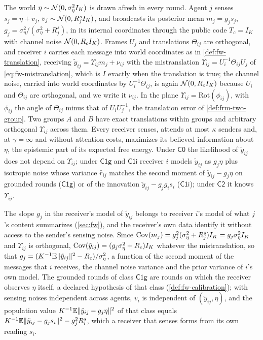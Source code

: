 \begin{definition}\label{def:coh-calibration-model}
The world $\eta\sim\mathcal{N}(0,\sigma_\eta^2I_K)$ is drawn afresh in every round. Agent $j$ senses $s_j=\eta+v_j$, $v_j\sim\mathcal{N}(0,R^s_jI_K)$, and broadcasts its posterior mean $m_j=g_js_j$, $g_j=\sigma_\eta^2/(\sigma_\eta^2+R^s_j)$, in its internal coordinates through the public code $T_c=I_K$ with channel noise $\mathcal{N}(0,R_cI_K)$. Frames $U_j$ and translations $\Theta_{ij}$ are orthogonal, and receiver $i$ carries each message into world coordinates as in \cref{def:fw-translation}, receiving $\tilde y_{ij}=\Upsilon_{ij}m_j+\nu_{ij}$ with the mistranslation $\Upsilon_{ij}=U_i^{-1}\Theta_{ij}U_j$ of \eqref{eq:fw-mistranslation}, which is $I$ exactly when the translation is true; the channel noise, carried into world coordinates by $U_i^{-1}\Theta_{ij}$, is again $\mathcal{N}(0,R_cI_K)$ because $U_i$ and $\Theta_{ij}$ are orthogonal, and we write it $\nu_{ij}$. In the plane $\Upsilon_{ij}=\mathrm{Rot}(\phi_{ij})$, with $\phi_{ij}$ the angle of $\Theta_{ij}$ minus that of $U_iU_j^{-1}$, the translation error of \cref{def:frm-two-group}. Two groups $A$ and $B$ have exact translations within groups and arbitrary orthogonal $\Upsilon_{ij}$ across them. Every receiver senses, attends at most $\kappa$ senders and, at $\gamma=\infty$ and without attention costs, maximizes its believed information about $\eta$, the epistemic part of its expected free energy. Under $\mathsf{C0}$ the likelihood of $\tilde y_{ij}$ does not depend on $\Upsilon_{ij}$; under $\mathsf{C1g}$ and $\mathsf{C1i}$ receiver $i$ models $\tilde y_{ij}$ as $g_j\eta$ plus isotropic noise whose variance $\hat r_{ij}$ matches the second moment of $\tilde y_{ij}-g_j\eta$ on grounded rounds ($\mathsf{C1g}$) or of the innovation $\tilde y_{ij}-g_jg_is_i$ ($\mathsf{C1i}$); under $\mathsf{C2}$ it knows $\Upsilon_{ij}$.
\end{definition}

The slope $g_j$ in the receiver's model of $\tilde y_{ij}$ belongs to receiver $i$'s model of what $j$'s content summarizes (\cref{sec:fw}), and the receiver's own data identify it without access to the sender's sensing noise. Since $\operatorname{Cov}(m_j)=g_j^2(\sigma_\eta^2+R^s_j)I_K=g_j\sigma_\eta^2I_K$ and $\Upsilon_{ij}$ is orthogonal, $\operatorname{Cov}(\tilde y_{ij})=(g_j\sigma_\eta^2+R_c)I_K$ whatever the mistranslation, so that $g_j=(K^{-1}\mathbb{E}\Vert\tilde y_{ij}\Vert^2-R_c)/\sigma_\eta^2$, a function of the second moment of the messages that $i$ receives, the channel noise variance and the prior variance of $i$'s own model. The grounded rounds of class $\mathsf{C1g}$ are rounds on which the receiver observes $\eta$ itself, a declared hypothesis of that class (\cref{def:fw-calibration}); with sensing noises independent across agents, $v_i$ is independent of $(\tilde y_{ij},\eta)$, and the population value $K^{-1}\mathbb{E}\Vert\tilde y_{ij}-g_j\eta\Vert^2$ of that class equals $K^{-1}\mathbb{E}\Vert\tilde y_{ij}-g_js_i\Vert^2-g_j^2R^s_i$, which a receiver that senses forms from its own reading $s_i$.

